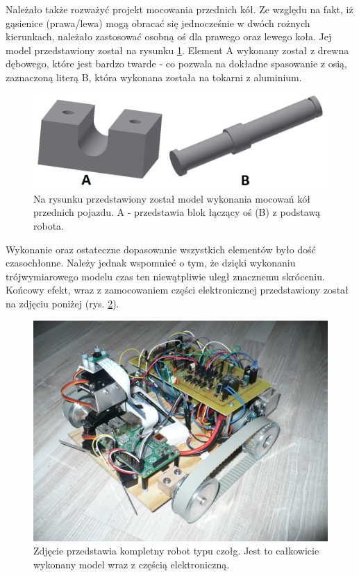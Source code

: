 Należało także rozważyć projekt mocowania przednich kół. Ze względu na fakt, iż gąsienice (prawa/lewa) mogą obracać się jednocześnie w dwóch rożnych kierunkach, należało zastosować osobną oś dla prawego oraz lewego koła. Jej model przedstawiony został na rysunku \ref{zamocowanie_przod}. Element A wykonany został z drewna dębowego, które jest bardzo twarde - co pozwala na dokładne spasowanie z osią, zaznaczoną literą B, która wykonana została na tokarni z aluminium.

  \begin{figure}[H]
    \begin{center}
      \includegraphics[scale=0.40]{imgs/moc_kol_prz.png}
 	\caption[Model mocowania kół przednich.]{\small{Na rysunku przedstawiony został model wykonania mocowań kół przednich pojazdu. A - przedstawia blok łączący oś (B) z podstawą robota.}}
	\label{zamocowanie_przod}
    \end{center}
  \end{figure}
  \newpage
{}
Wykonanie oraz ostateczne dopasowanie wszystkich elementów było dość czasochłonne. Należy jednak wspomnieć o tym, że dzięki wykonaniu trójwymiarowego modelu czas ten niewątpliwie uległ znacznemu skróceniu. Końcowy efekt, wraz z zamocowaniem części elektronicznej przedstawiony został na zdjęciu poniżej (rys. \ref{czolg_calosc}).
  \begin{figure}[H]
    \begin{center}
      \includegraphics[scale=0.13]{imgs/czolg.jpg}
 	\caption[Zbudowany model.]{\small{Zdjęcie przedstawia kompletny robot typu czołg. Jest to całkowicie wykonany model wraz z częścią elektroniczną.}}
	\label{czolg_calosc}
    \end{center}
  \end{figure}

